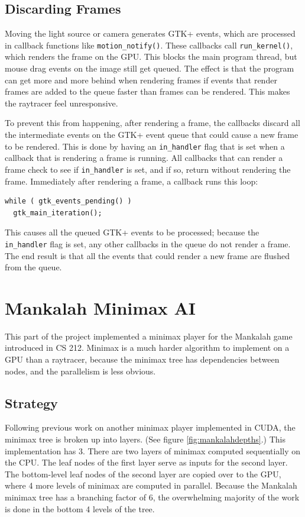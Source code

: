 \documentclass{article}
\begin{document}
\subsection{Discarding Frames}
Moving the light source or camera generates GTK+ events, which are processed in callback functions like \texttt{motion\_notify()}. These callbacks call \texttt{run\_kernel()}, which renders the frame on the GPU. This blocks the main program thread, but mouse drag events on the image still get queued. The effect is that the program can get more and more behind when rendering frames if events that render frames are added to the queue faster than frames can be rendered. This makes the raytracer feel unresponsive.

To prevent this from happening, after rendering a frame, the callbacks discard all the intermediate events on the GTK+ event queue that could cause a new frame to be rendered. This is done by having an \texttt{in\_handler} flag that is set when a callback that is rendering a frame is running. All callbacks that can render a frame check to see if \texttt{in\_handler} is set, and if so, return without rendering the frame. Immediately after rendering a frame, a callback runs this loop:

\begin{lstlisting}
while ( gtk_events_pending() )
  gtk_main_iteration();
\end{lstlisting}

This causes all the queued GTK+ events to be processed; because the \texttt{in\_handler} flag is set, any other callbacks in the queue do not render a frame. The end result is that all the events that could render a new frame are flushed from the queue.

\section{Mankalah Minimax AI}
This part of the project implemented a minimax player for the Mankalah game introduced in CS 212. Minimax is a much harder algorithm to implement on a GPU than a raytracer, because the minimax tree has dependencies between nodes, and the parallelism is less obvious.

\subsection{Strategy}
Following previous work on another minimax player implemented in CUDA\cite{rockisuda10}, the minimax tree is broken up into layers. (See figure \ref{fig:mankalahdepths}.) This implementation has 3. There are two layers of minimax computed sequentially on the CPU. The leaf nodes of the first layer serve as inputs for the second layer. The bottom-level leaf nodes of the second layer are copied over to the GPU, where 4 more levels of minimax are computed in parallel. Because the Mankalah minimax tree has a branching factor of 6, the overwhelming majority of the work is done in the bottom 4 levels of the tree.
\end{document}
